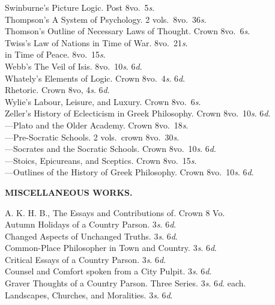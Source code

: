 \documentclass[letterpaper,12pt,oneside,openany]{memoir}
\newcommand{\D}{\hspace*{5mm}}
\newcommand{\E}{\hspace*{2mm}---\hspace*{2mm}}
\begin{document}
\begin{footnotesize}
Swinburne's Picture Logic. Post 8vo.\ 5\textit{s}.\\
Thompson's A System of Psychology. 2 vols.\ 8vo.\ 36\textit{s}.\\
Thomson's Outline of Necessary Laws of Thought. Crown 8vo.\ 6\textit{s}.\\
Twiss's Law of Nations in Time of War. 8vo.\ 21\textit{s}.\\
\D in Time of Peace. 8vo.\ 15\textit{s}.\\
Webb's The Veil of Isis. 8vo.\ 10\textit{s}. 6\textit{d}.\\
Whately's Elements of Logic. Crown 8vo.\ 4\textit{s}. 6\textit{d}.\\
\D Rhetoric. Crown 8vo, 4\textit{s}. 6\textit{d}.\\
Wylie's Labour, Leisure, and Luxury. Crown 8vo.\ 6\textit{s}.\\
Zeller's History of Eclecticism in Greek Philosophy. Crown 8vo.\ 10\textit{s}. 6\textit{d}.\\
\E Plato and the Older Academy. Crown 8vo.\ 18\textit{s}.\\
\E Pre-Socratic Schools. 2 vols.\ crown 8vo.\ 30\textit{s}.\\
\E Socrates and the Socratic Schools. Crown 8vo.\ 10\textit{s}. 6\textit{d}.\\
\E Stoics, Epicureans, and Sceptics. Crown 8vo.\ 15\textit{s}.\\
\E Outlines of the History of Greek Philosophy. Crown 8vo.\ 10\textit{s}. 6\textit{d}.
\begin{center}
\textbf{MISCELLANEOUS WORKS.}
\end{center}
A. K. H. B., The Essays and Contributions of. Crown 8 Vo.\\
\D Autumn Holidays of a Country Parson. 3\textit{s}. 6\textit{d}.\\
\D Changed Aspects of Unchanged Truths. 3\textit{s}. 6\textit{d}.\\
\D Common-Place Philosopher in Town and Country. 3\textit{s}. 6\textit{d}.\\
\D Critical Essays of a Country Parson. 3\textit{s}. 6\textit{d}.\\
\D Counsel and Comfort spoken from a City Pulpit. 3\textit{s}. 6\textit{d}.\\
\D Graver Thoughts of a Country Parson. Three Series. 3\textit{s}. 6\textit{d}. each.\\
\D Landscapes, Churches, and Moralities. 3\textit{s}. 6\textit{d}.\\

\end{footnotesize}
\end{document}

